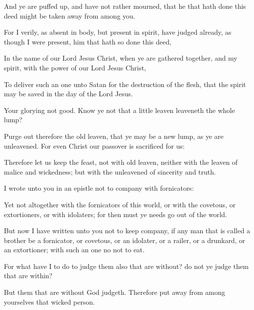 {And
ye
are puffed
up,
and
have
not
rather
mourned,
that he that hath
done
this
deed might be taken
away
from
among
you.

For
I
verily,
as
absent in
body,
but
present in
spirit, have
judged
already, as
though I were
present,
{} him
that hath
so
done
this
deed,

In the
name of
our
Lord
Jesus
Christ,
when
ye are gathered
together,
and
my
spirit,
with the
power of
our
Lord
Jesus
Christ,

To
deliver such an
one unto
Satan
for the
destruction of the
flesh,
that the
spirit may be
saved
in the
day of the
Lord
Jesus.

Your
glorying
{}
not
good. Know
ye
not
that a
little
leaven
leaveneth the
whole
lump?

Purge
out
therefore the
old
leaven,
that ye may
be a
new
lump,
as ye
are
unleavened.
For
even
Christ
our
passover is
sacrificed
for
us:

Therefore let us keep the
feast,
not
with
old
leaven,
neither
with the
leaven of
malice
and
wickedness;
but
with the
unleavened
{} of
sincerity
and
truth.

I
wrote unto
you
in an
epistle
not to
company with
fornicators:

Yet
not
altogether with the
fornicators of
this
world,
or with the
covetous,
or
extortioners,
or with
idolaters;
for
then must ye
needs go
out
of the
world.

But
now I have
written unto
you
not to keep
company,
if any
man that is
called a
brother
be a
fornicator,
or
covetous,
or an
idolater,
or a
railer,
or a
drunkard,
or an
extortioner; with such an
one no
not to
eat.

For
what have
I to do to
judge
them
also that
are
without?
do
not
ye
judge them that
are
within?

But them that
are
without
God
judgeth.
Therefore put
away
from among
yourselves
that wicked
person.




\par }
